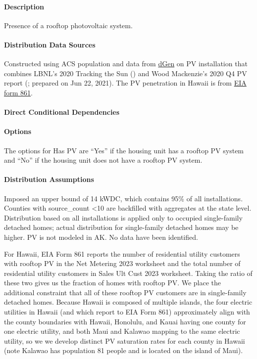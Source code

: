 \paragraph{Description}
% 
Presence of a rooftop photovoltaic system.

\paragraph{Distribution Data Sources}
% 
Constructed using ACS population and data from \href{https://www.nrel.gov/analysis/dgen/}{dGen} on PV installation that combines LBNL's 2020 Tracking the Sun (\cite{LBNLTTS2019}) and Wood Mackenzie's 2020 Q4 PV report (\cite{WoodsMackenzie2020}; prepared on Jun 22, 2021). The PV penetration in Hawaii is from \href{https://www.eia.gov/electricity/data/eia861/}{EIA form 861}. 

\paragraph{Direct Conditional Dependencies}


\paragraph{Options}
The options for Has PV are ``Yes'' if the housing unit has a rooftop PV system and ``No'' if the housing unit does not have a rooftop PV system.

\paragraph{Distribution Assumptions}
% 
Imposed an upper bound of 14 kWDC, which contains 95\% of all installations. Counties with source\_count <10 are backfilled with aggregates at the state level. Distribution based on all installations is applied only to occupied single-family detached homes; actual distribution for single-family detached homes may be higher. PV is not modeled in AK. No data have been identified. 

For Hawaii, EIA Form 861 reports the number of residential utility customers with rooftop PV in the Net Metering 2023 worksheet and the total number of residential utility customers in Sales Ult Cust 2023 worksheet. Taking the ratio of these two gives us the fraction of homes with rooftop PV. We place the additional constraint that all of these rooftop PV customers are in single-family detached homes. Because Hawaii is composed of multiple islands, the four electric utilities in Hawaii (and which report to EIA Form 861) approximately align with the county boundaries with Hawaii, Honolulu, and Kauai having one county for one electric utility, and both Maui and Kalawao mapping to the same electric utility, so we we develop distinct PV saturation rates for each county in Hawaii (note Kalawao has population 81 people and is located on the island of Maui).
